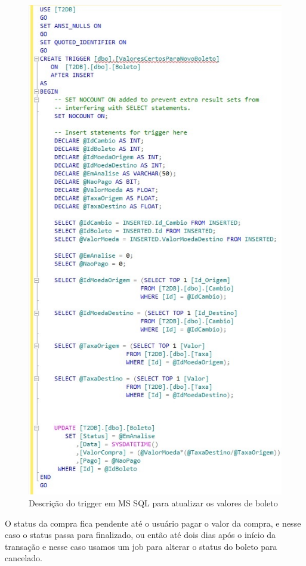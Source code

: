 \documentclass[conference]{IEEEtran}
\begin{document}
    \begin{figure}[!t]
      \centering
  	  \includegraphics[scale=0.6]{img/trigger.jpg}
      \caption{Descrição do trigger em MS SQL para atualizar os valores de boleto}
    \end{figure} 

    O status da compra fica pendente até o usuário pagar o valor da compra, e nesse caso o status passa para finalizado, ou então até dois dias após o início da transação e nesse caso usamos um job para alterar o status do boleto para cancelado.
\end{document}
